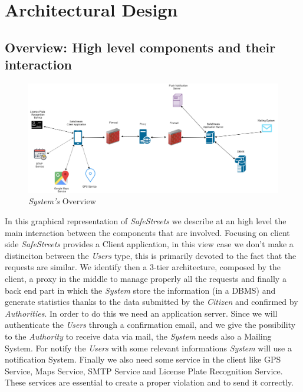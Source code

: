 \documentclass{article}
\begin{document}
\clearpage

\section{Architectural Design}

\subsection{Overview: High level components and their interaction}

\begin{figure}[H]
    \centering
    \includegraphics[scale=0.3]{img/overview.png}
    \caption{\textit{System's} Overview}
\end{figure}

In this graphical representation of \textit{SafeStreets} we describe at an high level the main interaction
between the components that are involved. Focusing on client side \textit{SafeStreets} provides a Client 
application, in this view case we don't make a distinciton between the \textit{Users} type, this is 
primarily devoted to the fact that the requests are similar. We identify then a 3-tier architecture, 
composed by the client, a proxy in the middle to manage properly all the requests and finally a back 
end part in which the \textit{System} store the information (in a DBMS) and generate statistics thanks
to the data submitted by the \textit{Citizen} and confirmed by \textit{Authorities}. In order to do this
we need an application server. Since we will authenticate the \textit{Users} through a confirmation email, 
and we give the possibility to the \textit{Authority} to receive data via mail, the \textit{System} needs
also a Mailing System. For notify the \textit{Users} with some relevant informations \textit{System} will 
use a notification System. Finally we also need some service in the client like GPS Service, Maps Service,
SMTP Service and License Plate Recognition Service. These services are essential to create a proper violation
and to send it correctly.
\end{document}
